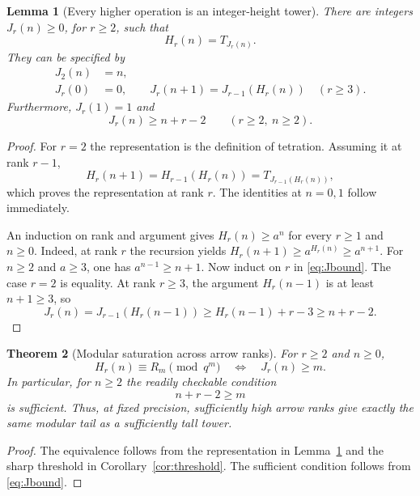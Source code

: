 \documentclass[11pt,a4paper]{article}
\numberwithin{equation}{section}
\theoremstyle{plain}
\newtheorem{theorem}{Theorem}[section]
\newtheorem{lemma}[theorem]{Lemma}
\theoremstyle{definition}
\begin{document}
\begin{lemma}[Every higher operation is an integer-height tower]
\label{lem:height}
There are integers $J_r(n)\ge0$, for $r\ge2$, such that
\[
 H_r(n)=T_{J_r(n)}.
\]
They can be specified by
\begin{align}
 J_2(n)&=n,\label{eq:Jbase}\\
 J_r(0)&=0,\qquad
 J_r(n+1)=J_{r-1}(H_r(n))\quad(r\ge3).\label{eq:Jrec}
\end{align}
Furthermore, $J_r(1)=1$ and
\begin{equation}\label{eq:Jbound}
 J_r(n)\ge n+r-2\qquad(r\ge2,\ n\ge2).
\end{equation}
\end{lemma}
\begin{proof}
For $r=2$ the representation is the definition of tetration.
Assuming it at rank $r-1$,
\[
 H_r(n+1)=H_{r-1}(H_r(n))
         =T_{J_{r-1}(H_r(n))},
\]
which proves the representation at rank $r$.
The identities at $n=0,1$ follow immediately.

An induction on rank and argument gives
$H_r(n)\ge a^n$ for every $r\ge1$ and $n\ge0$.
Indeed, at rank $r$ the recursion yields
$H_r(n+1)\ge a^{H_r(n)}\ge a^{n+1}$.
For $n\ge2$ and $a\ge3$, one has $a^{n-1}\ge n+1$.
Now induct on $r$ in \eqref{eq:Jbound}.  The case $r=2$ is equality.
At rank $r\ge3$, the argument $H_r(n-1)$ is at least $n+1\ge3$, so
\[
 J_r(n)=J_{r-1}(H_r(n-1))
 \ge H_r(n-1)+r-3\ge n+r-2.
\]
\end{proof}

\begin{theorem}[Modular saturation across arrow ranks]\label{thm:arrows}
For $r\ge2$ and $n\ge0$,
\begin{equation}\label{eq:arrowiff}
 H_r(n)\equiv R_m\pmod{q^m}
 \quad\Longleftrightarrow\quad J_r(n)\ge m.
\end{equation}
In particular, for $n\ge2$ the readily checkable condition
\begin{equation}\label{eq:arrowsufficient}
 n+r-2\ge m
\end{equation}
is sufficient.  Thus, at fixed precision, sufficiently high arrow
ranks give exactly the same modular tail as a sufficiently tall tower.
\end{theorem}
\begin{proof}
The equivalence follows from the representation in Lemma~\ref{lem:height}
and the sharp threshold in Corollary~\ref{cor:threshold}.  The sufficient
condition follows from \eqref{eq:Jbound}.
\end{proof}
\end{document}
